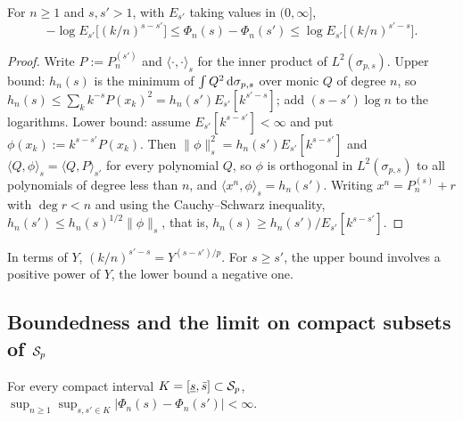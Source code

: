 \begin{lemma}\label{lem:sandwich}
For $n\ge1$ and $s,s'>1$, with $E_{s'}$ taking values in $(0,\infty]$,
\[
  -\log E_{s'}\bigl[(k/n)^{s-s'}\bigr]\le\Phi_n(s)-\Phi_n(s')\le\log E_{s'}\bigl[(k/n)^{s'-s}\bigr].
\]
\end{lemma}

\begin{proof}
Write $P:=P_n^{(s')}$ and $\langle\cdot,\cdot\rangle_s$ for the inner product of $L^2(\sigma_{p,s})$. Upper bound: $h_n(s)$ is
the minimum of $\int Q^2\,\mathrm{d}\sigma_{p,s}$ over monic $Q$ of degree $n$, so $h_n(s)\le\sum_kk^{-s}P(x_k)^2=
h_n(s')E_{s'}[k^{s'-s}]$; add $(s-s')\log n$ to the logarithms. Lower bound: assume $E_{s'}[k^{s-s'}]<\infty$ and put
$\phi(x_k):=k^{s-s'}P(x_k)$. Then $\|\phi\|_s^2=h_n(s')E_{s'}[k^{s-s'}]$ and $\langle Q,\phi\rangle_s=\langle
Q,P\rangle_{s'}$ for every polynomial $Q$, so $\phi$ is orthogonal in $L^2(\sigma_{p,s})$ to all polynomials of degree
less than $n$, and $\langle x^n,\phi\rangle_s=h_n(s')$. Writing $x^n=P_n^{(s)}+r$ with $\deg r<n$ and using the
Cauchy--Schwarz inequality, $h_n(s')\le h_n(s)^{1/2}\|\phi\|_s$, that is, $h_n(s)\ge h_n(s')/E_{s'}[k^{s-s'}]$.
\end{proof}

In terms of $Y$, $(k/n)^{s'-s}=Y^{(s-s')/p}$. For $s\ge s'$, the upper bound involves a positive power of $Y$, the
lower bound a negative one.

\subsection{Boundedness and the limit on compact subsets of \texorpdfstring{$\mathcal{S}_p$}{the window}}

\begin{proposition}\label{prop:UF}
For every compact interval $K=[\underline s,\bar s]\subset\mathcal{S}_p$, $\sup_{n\ge1}\sup_{s,s'\in K}|\Phi_n(s)-\Phi_n(s')|<\infty$.
\end{proposition}

